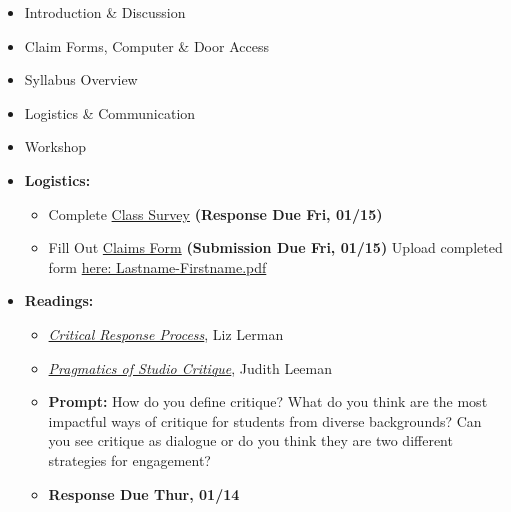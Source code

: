\def\dMon{Mon, 01/11}
\def\dTues{Tues, 01/12}
\def\dWed{Wed, 01/13}
\def\dThur{Thur, 01/14}
\def\dFri{Fri, 01/15}
\def\dSat{Sat, 01/16}
\def\dSun{Sun, 01/17}
\placeDate

\begin{itemize}[noitemsep,topsep=0pt,leftmargin=*]
      \item Introduction \& Discussion
      \item Claim Forms, Computer \& Door Access
      \item Syllabus Overview
      \item Logistics \& Communication
      \item Workshop
\end{itemize}
\vspace{1em}
\begin{itemize}[noitemsep,topsep=0pt,leftmargin=*]
      \item \textbf{Logistics:}
            \begin{itemize}
                  \item Complete \href{https://forms.gle/t2oFW9zMPq9WHAhT7}{Class Survey} \textbf{(Response Due \dFri)}
                  \item Fill Out \href{https://drive.google.com/file/d/1SeksTmFmQa6uehrmoSIL_uO8tuORo0P3/view}{Claims Form} \textbf{(Submission Due \dFri)}
                        \newline Upload completed form \href{https://osu.app.box.com/f/572052d11c8a4e3ab7d1320328d028a0}{here: Lastname-Firstname.pdf}
            \end{itemize}
      \item \textbf{Readings:}
            \begin{itemize}
                  \item \emph{\href{https://drive.google.com/file/d/1tnvKJBaXn2kFXjp-KB8p0_dkKuw1R4fu/view?usp=sharing}{Critical Response Process}}, Liz Lerman
                  \item \emph{\href{https://drive.google.com/file/d/1vUej0gK5nckVl6hvf68lcHJrh1w73h12/view?usp=sharing}{Pragmatics of Studio Critique}}, Judith Leeman
                  \item \textbf{Prompt:} How do you define critique? What do you think are the most impactful ways of critique for students from diverse backgrounds? Can you see critique as dialogue or do you think they are two different strategies for engagement?
                  \item \textbf{Response Due \dThur}

\end{itemize}
\end{itemize}
